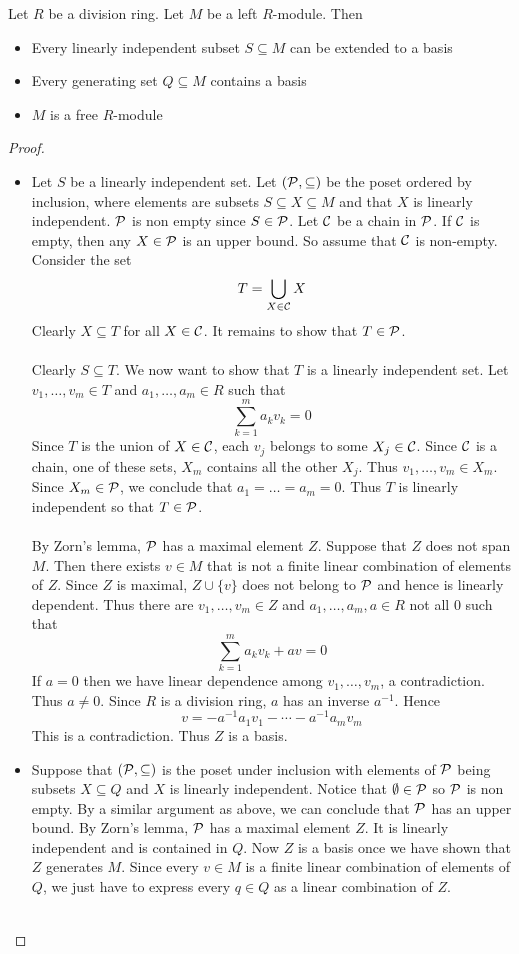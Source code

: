 \documentclass[a4paper]{article}
\begin{document}
\begin{thm}{}{} Let $R$ be a division ring. Let $M$ be a left $R$-module. Then
\begin{itemize}
\item Every linearly independent subset $S\subseteq M$ can be extended to a basis
\item Every generating set $Q\subseteq M$ contains a basis
\item $M$ is a free $R$-module
\end{itemize} \tcbline
\begin{proof}~\\
\begin{itemize}
\item Let $S$ be a linearly independent set. Let $(\mathcal{P},\subseteq)$ be the poset ordered by inclusion, where elements are subsets $S\subseteq X\subseteq M$ and that $X$ is linearly independent. $\mathcal{P}$ is non empty since $S\in\mathcal{P}$. Let $\mathcal{C}$ be a chain in $\mathcal{P}$. If $\mathcal{C}$ is empty, then any $X\in\mathcal{P}$ is an upper bound. So assume that $\mathcal{C}$ is non-empty. Consider the set $$T=\bigcup_{X\in\mathcal{C}}X$$ Clearly $X\subseteq T$ for all $X\in\mathcal{C}$. It remains to show that $T\in\mathcal{P}$. \\~\\

Clearly $S\subseteq T$. We now want to show that $T$ is a linearly independent set. Let $v_1,\dots,v_m\in T$ and $a_1,\dots,a_m\in R$ such that $$\sum_{k=1}^ma_kv_k=0$$ Since $T$ is the union of $X\in\mathcal{C}$, each $v_j$ belongs to some $X_j\in\mathcal{C}$. Since $\mathcal{C}$ is a chain, one of these sets, $X_m$ contains all the other $X_j$. Thus $v_1,\dots,v_m\in X_m$. Since $X_m\in\mathcal{P}$, we conclude that $a_1=\dots=a_m=0$. Thus $T$ is linearly independent so that $T\in\mathcal{P}$. \\~\\

By Zorn's lemma, $\mathcal{P}$ has a maximal element $Z$. Suppose that $Z$ does not span $M$. Then there exists $v\in M$ that is not a finite linear combination of elements of $Z$. Since $Z$ is maximal, $Z\cup\{v\}$ does not belong to $\mathcal{P}$ and hence is linearly dependent. Thus there are $v_1,\dots,v_m\in Z$ and $a_1,\dots,a_m,a\in R$ not all $0$ such that $$\sum_{k=1}^ma_kv_k+av=0$$ If $a=0$ then we have linear dependence among $v_1,\dots,v_m$, a contradiction. Thus $a\neq 0$. Since $R$ is a division ring, $a$ has an inverse $a^{-1}$. Hence $$v=-a^{-1}a_1v_1-\cdots-a^{-1}a_mv_m$$ This is a contradiction. Thus $Z$ is a basis. 

\item Suppose that $(\mathcal{P},\subseteq)$ is the poset under inclusion with elements of $\mathcal{P}$ being subsets $X\subseteq Q$ and $X$ is linearly independent. Notice that $\emptyset\in\mathcal{P}$ so $\mathcal{P}$ is non empty. By a similar argument as above, we can conclude that $\mathcal{P}$ has an upper bound. By Zorn's lemma, $\mathcal{P}$ has a maximal element $Z$. It is linearly independent and is contained in $Q$. Now $Z$ is a basis once we have shown that $Z$ generates $M$. Since every $v\in M$ is a finite linear combination of elements of $Q$, we just have to express every $q\in Q$ as a linear combination of $Z$. \\~\\


\end{itemize}
\end{proof}
\end{thm}
\end{document}
